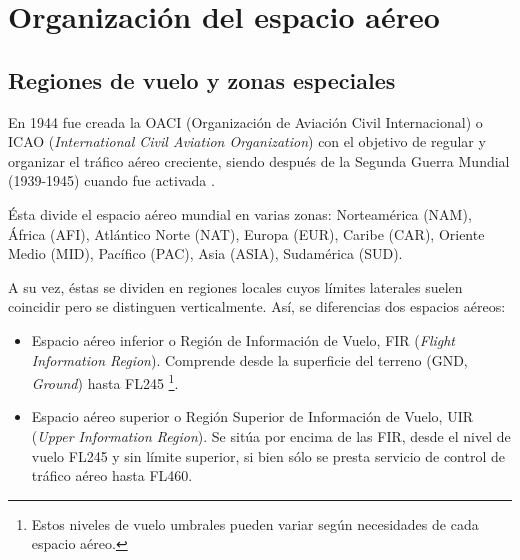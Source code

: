 \clearpage


\section{Organización del espacio aéreo}
\label{sec:OrganizacionEspacioAereo}

\subsection{Regiones de vuelo y zonas especiales}
\label{subsec:RegionesVueloZonasEspeciales}

En 1944 fue creada la OACI (Organización de Aviación Civil Internacional) o ICAO (\textit{International Civil Aviation Organization}) con el objetivo de regular y organizar el tráfico aéreo creciente, siendo después de la Segunda Guerra Mundial (1939-1945) cuando fue activada \cite{Ontiveros}.

Ésta divide el espacio aéreo mundial en varias zonas:  
Norteamérica (NAM),
África (AFI),
Atlántico Norte (NAT),
Europa (EUR),
Caribe (CAR),
Oriente Medio (MID),
Pacífico (PAC),
Asia (ASIA),
Sudamérica (SUD).


%
%

A su vez, éstas se dividen en regiones locales cuyos límites laterales suelen coincidir pero se distinguen verticalmente. Así, se diferencias dos espacios aéreos:

\begin{itemize}

	\item Espacio aéreo inferior o Región de Información de Vuelo, FIR (\textit{Flight Information Region}). Comprende desde la superficie del terreno (GND, \textit{Ground}) hasta FL245 \footnote{Estos niveles de vuelo umbrales pueden variar según necesidades de cada espacio aéreo.}.
	
	\item Espacio aéreo superior o Región Superior de Información de Vuelo, UIR (\textit{Upper Information Region}). Se sitúa por encima de las FIR, desde el nivel de vuelo FL245 y sin límite superior, si bien sólo se presta servicio de control de tráfico aéreo hasta FL460.
	
\end{itemize}

